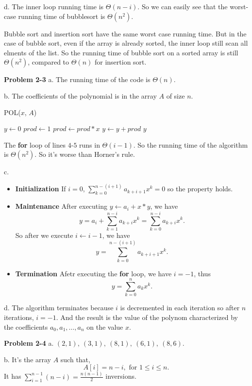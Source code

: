 \documentclass[a4paper,12pt]{article}
\newcommand{\newprob}[1]
{\bigskip \noindent \textbf{Problem #1} \newline}
\newcommand{\subpar}[1]
{\medskip \noindent #1.}
\newcommand{\la}{\leftarrow}
\begin{document}
\subpar{d} The inner loop running time is $\Theta(n-i)$.  So we can
easily see that the worst-case running time of bubblesort is
$\Theta(n^2)$.

Bubble sort and insertion sort have the same worst case running time.
But in the case of bubble sort, even if the array is already sorted,
the inner loop still scan all elments of the list.  So the
running time of bubble sort on a sorted array is still $\Theta(n^2)$,
compared to $\Theta(n)$ for insertion sort.

\newprob{2-3}
\subpar{a} The running time of the code is $\Theta(n)$.

\subpar{b}  The coefficients of the polynomial is in the array $A$ of
size $n$.

\noindent
POL($x$, $A$)
\begin{algorithmic}[1]
\STATE $y \la 0$
\FOR {$ i \la 1$ \textbf{to} $length[A]$}
	\STATE $prod \la 1$
	\FOR {$j \la 1$ \textbf{to} $i-1$}
		\STATE $prod \la prod * x$
	\ENDFOR
	\STATE $y \la y + prod$
\ENDFOR
\RETURN $y$		
\end{algorithmic}

The \textbf{for} loop of lines $4$-$5$ runs in $\Theta(i-1)$.  So the
running time of the algorithm is $\Theta(n^2)$.  So it's worse than
Horner's rule.

\subpar{c} 
\begin{itemize}
\item
\textbf{Initialization}  If $i=0$, $\sum_{k=0}^{n-(i+1)}a_{k+i+1}x^k =
0$ so the property holds.

\item
\textbf{Maintenance} After executing $y \la a_i + x * y$, we have
\[ y = a_i + \sum_{k=1}^{n-i}a_{k+i}x^k =
\sum_{k=0}^{n-i}a_{k+i}x^k.\]
So after we execute $i \la i-1$, we have 
\[ y = \sum_{k=0}^{n-(i+1)}a_{k+i+1}x^k.\]

\item
\textbf{Termination} Afetr executing the \textbf{for} loop, we have $i
= -1$, thus
\[ y = \sum_{k=0}^n a_k x^k.\]
\end{itemize}

\subpar{d} The algorithm terminates because $i$ is decremented in
each iteration so after $n$ iterations, $i = -1$.  And the result is
the value of the polynom characterized by the coefficients 
$a_0, a_1, \ldots, a_n$ on the value $x$.

\newprob{2-4}
\subpar{a} $(2, 1),\ (3, 1),\ (8, 1),\ (6, 1),\ (8, 6)$.

\subpar{b} It's the array $A$ such that,
\[ A[i] = n-i, \mbox{ for } 1\le i\le n.\]
It has $\sum_{i=1}^{n-1}(n-i) = \frac{n(n-1)}{2}$ inversions.
\end{document}
